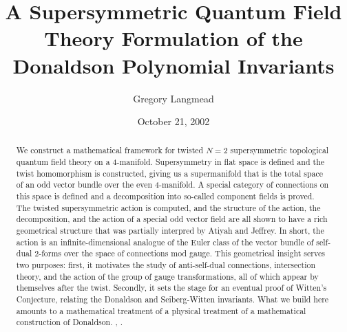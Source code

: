 \documentclass[twoside]{amsart}
\title{A Supersymmetric Quantum Field Theory Formulation of the Donaldson
Polynomial Invariants}
\author{Gregory Langmead}
\date{October 21, 2002}
\begin{document}
\begin{abstract}
We construct a mathematical framework for twisted \( N=2 \)
supersymmetric topological quantum field theory on a 4-manifold.
Supersymmetry in flat space is defined and the twist homomorphism is
constructed, giving us a supermanifold that is the total space of an
odd vector bundle over the even 4-manifold.  A special category of
connections on this space is defined and a decomposition into
so-called component fields is proved.  The twisted supersymmetric
action is computed, and the structure of the action, the
decomposition, and the action of a special odd vector field are all
shown to have a rich geometrical structure that was partially
interpred by Atiyah and Jeffrey. \cite{atiyahjeffrey}
In short, the
action is an infinite-dimensional analogue of the Euler class of the
vector bundle of self-dual 2-forms over the space of connections mod
gauge.  This geometrical insight serves two purposes: first, it
motivates the study of anti-self-dual connections, intersection
theory, and the action of the group of gauge transformations, all of
which appear by themselves after the twist.  Secondly, it sets the
stage for an eventual proof of Witten's Conjecture, relating the
Donaldson and Seiberg-Witten invariants.  What we build here amounts
to a mathematical treatment of a physical treatment \cite{wittentqft}
of a mathematical construction of Donaldson. \cite{donaldsonpoly},
\cite{donaldsonkronheimer}.
\end{abstract}

\maketitle

\pagestyle{myheadings}
\end{document}
